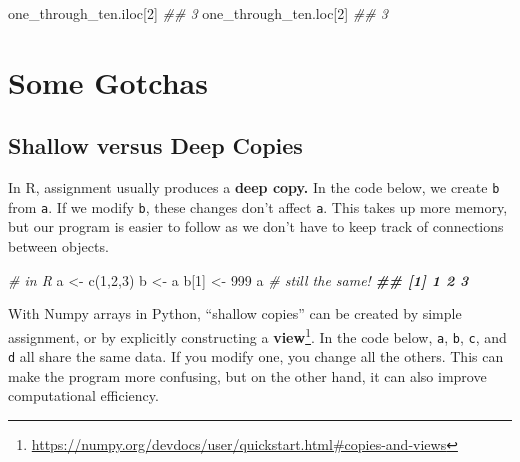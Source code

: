 \documentclass[
  12pt,
  krantz2]{krantz}
\makeatletter
\newenvironment{Shaded}{\begin{snugshade}}{\end{snugshade}}
\newcommand{\CommentTok}[1]{\textcolor[rgb]{0.37,0.37,0.37}{\textit{#1}}}
\newcommand{\DecValTok}[1]{\textcolor[rgb]{0.06,0.06,0.06}{#1}}
\newcommand{\DocumentationTok}[1]{\textcolor[rgb]{0.37,0.37,0.37}{\textbf{\textit{#1}}}}
\newcommand{\FunctionTok}[1]{\textcolor[rgb]{0,0,0}{#1}}
\newcommand{\NormalTok}[1]{#1}
\newcommand{\OtherTok}[1]{\textcolor[rgb]{0.37,0.37,0.37}{#1}}
\renewcommand{\href}[2]{#2\footnote{\url{#1}}}
\newenvironment{kframe}{%
\medskip{}
\setlength{\fboxsep}{.8em}
 \def\at@end@of@kframe{}%
 \ifinner\ifhmode%
  \def\at@end@of@kframe{\end{minipage}}%
  \begin{minipage}{\columnwidth}%
 \fi\fi%
 \def\FrameCommand##1{\hskip\@totalleftmargin \hskip-\fboxsep
 \colorbox{shadecolor}{##1}\hskip-\fboxsep
     \hskip-\linewidth \hskip-\@totalleftmargin \hskip\columnwidth}%
 \MakeFramed {\advance\hsize-\width
   \@totalleftmargin\z@ \linewidth\hsize
   \@setminipage}}%
 {\par\unskip\endMakeFramed%
 \at@end@of@kframe}
\renewenvironment{Shaded}{\begin{kframe}}{\end{kframe}}
\makeatother
\begin{document}
\begin{Shaded}
\begin{Highlighting}[]
\NormalTok{one\_through\_ten.iloc[}\DecValTok{2}\NormalTok{]}
\CommentTok{\#\# 3}
\NormalTok{one\_through\_ten.loc[}\DecValTok{2}\NormalTok{]}
\CommentTok{\#\# 3}
\end{Highlighting}
\end{Shaded}

\hypertarget{some-gotchas}{%
\section{Some Gotchas}\label{some-gotchas}}

\hypertarget{shallow-versus-deep-copies}{%
\subsection{Shallow versus Deep Copies}\label{shallow-versus-deep-copies}}

In R, assignment usually produces a \textbf{deep copy.} In the code below, we create \texttt{b} from \texttt{a}. If we modify \texttt{b}, these changes don't affect \texttt{a}. This takes up more memory, but our program is easier to follow as we don't have to keep track of connections between objects.

\begin{Shaded}
\begin{Highlighting}[]
\CommentTok{\# in R}
\NormalTok{a }\OtherTok{\textless{}{-}} \FunctionTok{c}\NormalTok{(}\DecValTok{1}\NormalTok{,}\DecValTok{2}\NormalTok{,}\DecValTok{3}\NormalTok{)}
\NormalTok{b }\OtherTok{\textless{}{-}}\NormalTok{ a}
\NormalTok{b[}\DecValTok{1}\NormalTok{] }\OtherTok{\textless{}{-}} \DecValTok{999}
\NormalTok{a }\CommentTok{\# still the same!}
\DocumentationTok{\#\# [1] 1 2 3}
\end{Highlighting}
\end{Shaded}

With Numpy arrays in Python, \href{https://numpy.org/devdocs/user/quickstart.html\#copies-and-views}{``shallow copies'' can be created by simple assignment, or by explicitly constructing a \textbf{view}}. In the code below, \texttt{a}, \texttt{b}, \texttt{c}, and \texttt{d} all share the same data. If you modify one, you change all the others. This can make the program more confusing, but on the other hand, it can also improve computational efficiency.
\end{document}
